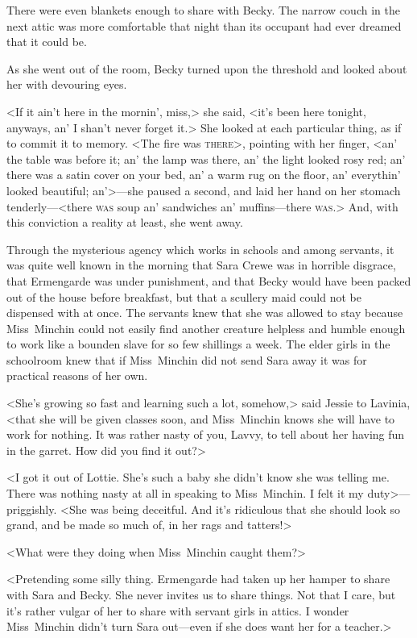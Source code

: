 There were even blankets enough to share with Becky. The narrow couch in the next attic was more comfortable that night than its occupant had ever dreamed that it could be.

As she went out of the room, Becky turned upon the threshold and looked about her with devouring eyes.

<If it ain't here in the mornin', miss,> she said, <it's been here tonight, anyways, an' I shan't never forget it.> She looked at each particular thing, as if to commit it to memory. <The fire was \textsc{there}>, pointing with her finger, <an' the table was before it; an' the lamp was there, an' the light looked rosy red; an' there was a satin cover on your bed, an' a warm rug on the floor, an' everythin' looked beautiful; an'>—she paused a second, and laid her hand on her stomach tenderly—<there \textsc{was} soup an' sandwiches an' muffins—there \textsc{was}.> And, with this conviction a reality at least, she went away.

Through the mysterious agency which works in schools and among servants, it was quite well known in the morning that Sara Crewe was in horrible disgrace, that Ermengarde was under punishment, and that Becky would have been packed out of the house before breakfast, but that a scullery maid could not be dispensed with at once. The servants knew that she was allowed to stay because Miss~Minchin could not easily find another creature helpless and humble enough to work like a bounden slave for so few shillings a week. The elder girls in the schoolroom knew that if Miss~Minchin did not send Sara away it was for practical reasons of her own.

<She's growing so fast and learning such a lot, somehow,> said Jessie to Lavinia, <that she will be given classes soon, and Miss~Minchin knows she will have to work for nothing. It was rather nasty of you, Lavvy, to tell about her having fun in the garret. How did you find it out?>

<I got it out of Lottie. She's such a baby she didn't know she was telling me. There was nothing nasty at all in speaking to Miss~Minchin. I felt it my duty>—priggishly. <She was being deceitful. And it's ridiculous that she should look so grand, and be made so much of, in her rags and tatters!>

<What were they doing when Miss~Minchin caught them?>

<Pretending some silly thing. Ermengarde had taken up her hamper to share with Sara and Becky. She never invites us to share things. Not that I care, but it's rather vulgar of her to share with servant girls in attics. I wonder Miss~Minchin didn't turn Sara out—even if she does want her for a teacher.>

